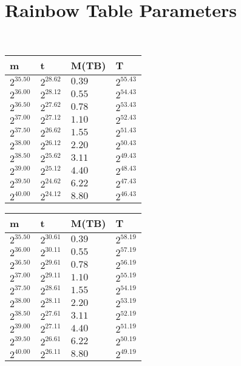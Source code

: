 \section{Rainbow Table Parameters}
\label{sec:rainbowtab}
\begin{table}[h!]\centering
 \ 
\begin{tabular}{llll}
m & t & M(TB) & T \\ \hline
$2^{35.50}$ & $2^{28.62}$ & $0.39$ & $2^{55.43}$ \\
$2^{36.00}$ & $2^{28.12}$ & $0.55$ & $2^{54.43}$ \\
$2^{36.50}$ & $2^{27.62}$ & $0.78$ & $2^{53.43}$ \\
$2^{37.00}$ & $2^{27.12}$ & $1.10$ & $2^{52.43}$ \\
$2^{37.50}$ & $2^{26.62}$ & $1.55$ & $2^{51.43}$ \\
$2^{38.00}$ & $2^{26.12}$ & $2.20$ & $2^{50.43}$ \\
$2^{38.50}$ & $2^{25.62}$ & $3.11$ & $2^{49.43}$ \\
$2^{39.00}$ & $2^{25.12}$ & $4.40$ & $2^{48.43}$ \\
$2^{39.50}$ & $2^{24.62}$ & $6.22$ & $2^{47.43}$ \\
$2^{40.00}$ & $2^{24.12}$ & $8.80$ & $2^{46.43}$ \\
\end{tabular}
\end{table}


\begin{table}[h!]\centering
  \begin{tabular}{llll}
    m & t & M(TB) & T \\ \hline
    $2^{35.50}$ & $2^{30.61}$ & $0.39$ & $2^{58.19}$ \\
    $2^{36.00}$ & $2^{30.11}$ & $0.55$ & $2^{57.19}$ \\
    $2^{36.50}$ & $2^{29.61}$ & $0.78$ & $2^{56.19}$ \\
    $2^{37.00}$ & $2^{29.11}$ & $1.10$ & $2^{55.19}$ \\
    $2^{37.50}$ & $2^{28.61}$ & $1.55$ & $2^{54.19}$ \\
    $2^{38.00}$ & $2^{28.11}$ & $2.20$ & $2^{53.19}$ \\
    $2^{38.50}$ & $2^{27.61}$ & $3.11$ & $2^{52.19}$ \\
    $2^{39.00}$ & $2^{27.11}$ & $4.40$ & $2^{51.19}$ \\
    $2^{39.50}$ & $2^{26.61}$ & $6.22$ & $2^{50.19}$ \\
    $2^{40.00}$ & $2^{26.11}$ & $8.80$ & $2^{49.19}$ \\
  \end{tabular}
\end{table}


